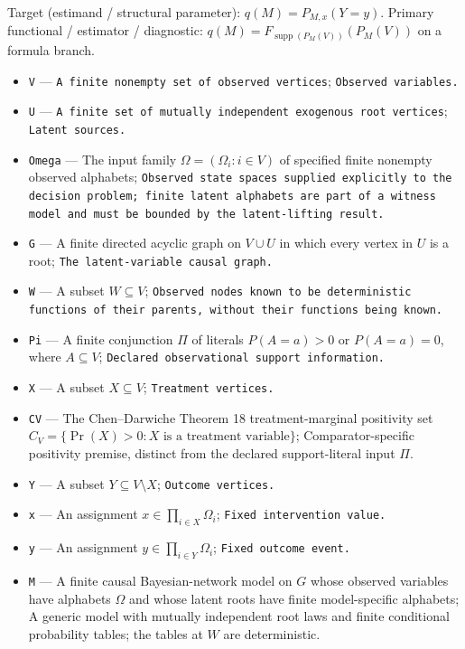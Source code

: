 \documentclass{article}
\begin{document}
Target (estimand / structural parameter): \(q(M)=P_{M,x}(Y=y)\).
Primary functional / estimator / diagnostic: \(q(M)=F_{\operatorname{supp}(P_M(V))}(P_M(V))\) on a formula branch.
\begin{itemize}
  \item \texttt{V} --- \texttt{A finite nonempty set of observed vertices}; \texttt{Observed variables.}
  \item \texttt{U} --- \texttt{A finite set of mutually independent exogenous root vertices}; \texttt{Latent sources.}
  \item \texttt{Omega} --- The input family \(\Omega=(\Omega_i:i\in V)\) of specified finite nonempty observed alphabets; \texttt{Observed state spaces supplied explicitly to the decision problem;\allowbreak{} finite latent alphabets are part of a witness model and must be bounded by the latent-\allowbreak{}lifting result.}
  \item \texttt{G} --- A finite directed acyclic graph on \(V\cup U\) in which every vertex in \(U\) is a root; \texttt{The latent-\allowbreak{}variable causal graph.}
  \item \texttt{W} --- A subset \(W\subseteq V\); \texttt{Observed nodes known to be deterministic functions of their parents,\allowbreak{} without their functions being known.}
  \item \texttt{Pi} --- A finite conjunction \(\Pi\) of literals \(P(A=a)>0\) or \(P(A=a)=0\), where \(A\subseteq V\); \texttt{Declared observational support information.}
  \item \texttt{X} --- A subset \(X\subseteq V\); \texttt{Treatment vertices.}
  \item \texttt{CV} --- The Chen--Darwiche Theorem 18 treatment-marginal positivity set \(C_V=\{\Pr(X)>0:X\text{ is a treatment variable}\}\); Comparator-specific positivity premise, distinct from the declared support-literal input \(\Pi\).
  \item \texttt{Y} --- A subset \(Y\subseteq V\setminus X\); \texttt{Outcome vertices.}
  \item \texttt{x} --- An assignment \(x\in\prod_{i\in X}\Omega_i\); \texttt{Fixed intervention value.}
  \item \texttt{y} --- An assignment \(y\in\prod_{i\in Y}\Omega_i\); \texttt{Fixed outcome event.}
  \item \texttt{M} --- A finite causal Bayesian-network model on \(G\) whose observed variables have alphabets \(\Omega\) and whose latent roots have finite model-specific alphabets; A generic model with mutually independent root laws and finite conditional probability tables; the tables at \(W\) are deterministic.

\end{itemize}
\end{document}
